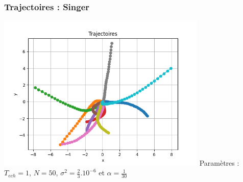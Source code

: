 \documentclass{beamer}
\begin{document}
\begin{frame}
  \frametitle{Trajectoires : Singer}
  \includegraphics[width=0.75\textwidth]{images/SINGER_Trajectoires.png}
  Paramètres : $T_{ech} = 1$, $N = 50$, $\sigma^2 = \frac{2}{3}.10^{-6}$ et $\alpha = \frac{1}{30}$
\end{frame}
\end{document}
